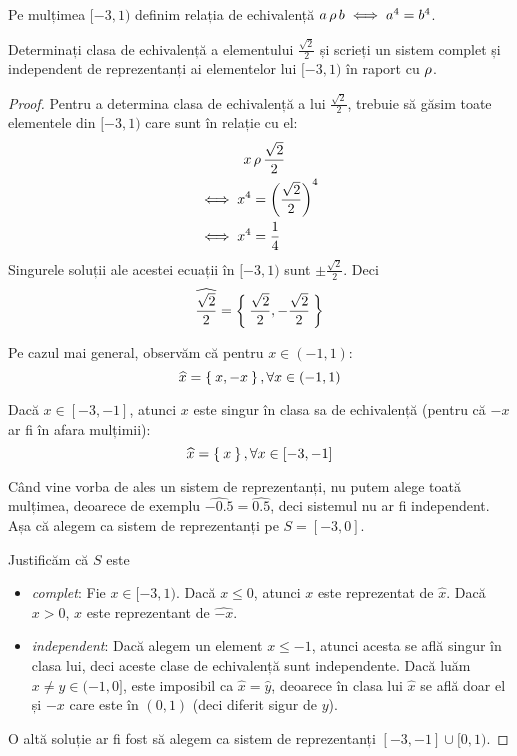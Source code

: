 \begin{exercise}
Pe mulțimea \([-3, 1)\) definim relația de echivalență \(a \operatorname{\rho} b \iff a^4 = b^4\).

Determinați clasa de echivalență a elementului \(\frac{\sqrt{2}}{2}\) și scrieți un sistem complet și independent de reprezentanți ai elementelor lui \([-3, 1)\) în raport cu \(\operatorname{\rho}\).
\end{exercise}
\begin{proof}
Pentru a determina clasa de echivalență a lui \(\frac{\sqrt{2}}{2}\), trebuie să găsim toate elementele din \([-3, 1)\) care sunt în relație cu el:
\begin{align*}
    x &\operatorname{\rho} \frac{\sqrt{2}}{2} \\
    \iff x^4 &= \left(\frac{\sqrt{2}}{2}\right)^4 \\
    \iff x^4 &= \frac{1}{4}
\end{align*}
Singurele soluții ale acestei ecuații în \([-3, 1)\) sunt \(\pm \frac{\sqrt{2}}{2}\). Deci
\[
    \widehat{\frac{\sqrt{2}}{2}} = \Set{ \frac{\sqrt{2}}{2}, -\frac{\sqrt{2}}{2} }
\]

Pe cazul mai general, observăm că pentru \(x \in (-1, 1)\):
\[
\widehat{x} = \Set{x, -x}, \forall x \in (-1, 1)
\]

Dacă \(x \in [-3, -1]\), atunci \(x\) este singur în clasa sa de echivalență (pentru că \(-x\) ar fi în afara mulțimii):
\[
\widehat{x} = \Set{x}, \forall x \in [-3, -1]
\]

Când vine vorba de ales un sistem de reprezentanți, nu putem alege toată mulțimea, deoarece de exemplu \(\widehat{-0.5} = \widehat{0.5}\), deci sistemul nu ar fi independent. Așa că alegem ca sistem de reprezentanți pe \(S = [-3, 0]\).

Justificăm că \(S\) este
\begin{itemize}
    \item \emph{complet}: Fie \(x \in [-3, 1)\). Dacă \(x \leq 0\), atunci \(x\) este reprezentat de \(\widehat{x}\). Dacă \(x > 0\), \(x\) este reprezentant de \(\widehat{-x}\).
    \item \emph{independent}: Dacă alegem un element \(x \leq -1\), atunci acesta se află singur în clasa lui, deci aceste clase de echivalență sunt independente. Dacă luăm \(x \neq y \in (-1, 0]\), este imposibil ca \(\widehat{x} = \widehat{y}\), deoarece  în clasa lui \(\widehat{x}\) se află doar el și \(-x\) care este în \((0, 1)\) (deci diferit sigur de \(y\)).
\end{itemize}

O altă soluție ar fi fost să alegem ca sistem de reprezentanți \([-3, -1] \cup [0, 1)\).
\end{proof}

